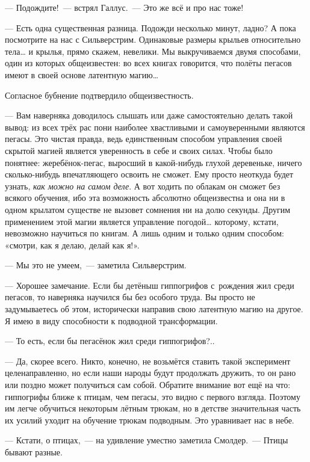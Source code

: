 \documentclass[fontsize=11pt,a5paper,titlepage=firstcover]{scrbook}
\begin{document}
--- Подождите!~--- встрял Галлус.~--- Это же всё и про нас тоже!

--- Есть одна существенная разница. Подожди несколько минут, ладно? А пока посмотрите на нас с Сильверстрим. Одинаковые размеры крыльев относительно тела{\ldots} и крылья, прямо скажем, невелики. Мы выкручиваемся двумя способами, один из которых общеизвестен: во всех книгах говорится, что полёты пегасов имеют в своей основе латентную магию{\ldots}

Согласное бубнение подтвердило общеизвестность.

--- Вам наверняка доводилось слышать или даже самостоятельно делать такой вывод: из всех трёх рас пони наиболее хвастливыми и самоуверенными являются пегасы. Это чистая правда, ведь единственным способом управления своей скрытой магией является уверенность в себе и своих силах. Чтобы было понятнее: жеребёнок-пегас, выросший в какой-нибудь глухой деревеньке, ничего сколько-нибудь впечатляющего освоить не сможет. Ему просто неоткуда будет узнать, \emph{как можно на самом деле}. А вот ходить по облакам он сможет без всякого обучения, ибо эта возможность абсолютно общеизвестна и она ни в одном крылатом существе не вызовет сомнения ни на долю секунды. Другим применением этой магии является управление погодой{\ldots} которому, кстати, невозможно научиться по книгам. А лишь одним и только одним способом: «смотри, как я делаю, делай как я!».

--- Мы это не умеем,~--- заметила Сильверстрим.

--- Хорошее замечание. Если бы детёныш гиппогрифов с~рождения жил среди пегасов, то наверняка научился бы без особого труда. Вы просто не задумываетесь об этом, исторически направив свою латентную магию на другое. Я имею в виду способности к подводной трансформации.

--- То есть, если бы пегасёнок жил среди гиппогрифов?..

--- Да, скорее всего. Никто, конечно, не возьмётся ставить такой эксперимент целенаправленно, но если наши народы будут продолжать дружить, то он рано или поздно может получиться сам собой. Обратите внимание вот ещё на что: гиппогрифы ближе к птицам, чем пегасы, это видно с первого взгляда. Поэтому им легче обучиться некоторым лётным трюкам, но в детстве значительная часть их усилий уходит на обучение трюкам подводным. Это уравнивает нас в небе.

--- Кстати, о птицах,~--- на удивление уместно заметила Смолдер.~--- Птицы бывают разные.
\end{document}
